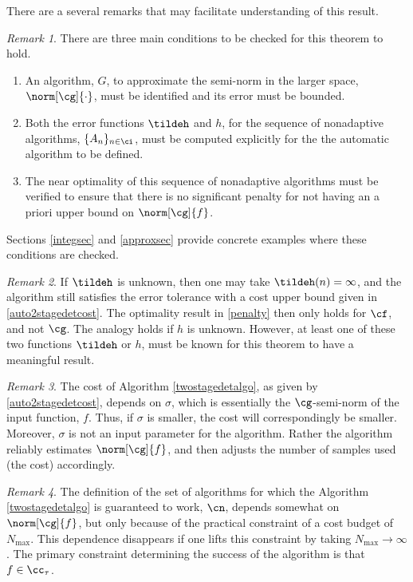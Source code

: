 \documentclass[]{elsarticle}
\theoremstyle{definition}
\theoremstyle{remark}
\newtheorem{rem}{Remark}
\begin{document}
There are a several remarks that may facilitate understanding of this result.

\begin{rem} There are three main conditions to be checked for this theorem to hold.
\begin{enumerate}
\renewcommand{\labelenumi}{\roman{enumi}.}
\item An algorithm, $G$, to approximate the semi-norm in the larger space,  $\norm[\cg]{\cdot}$,  must be identified and its error must be bounded.
\item Both the error functions $\tildeh$ and $h$, for the sequence of nonadaptive algorithms, $\{A_n\}_{n \in \ci}$, must be computed explicitly for the the automatic algorithm to be defined.  
\item The near optimality of this sequence of nonadaptive algorithms must be verified to ensure that there is no significant penalty for not having an a priori upper bound on $\norm[\cg]{f}$.
\end{enumerate}
Sections \ref{integsec} and \ref{approxsec} provide concrete examples where these conditions are checked.
\end{rem}

\begin{rem} If $\tildeh$ is unknown, then one may take $\tildeh(n)=\infty$, and the algorithm still satisfies the error tolerance with a cost upper bound given in \eqref{auto2stagedetcost}.  The optimality result in \eqref{penalty} then only holds for $\cf$, and not $\cg$.  The analogy holds if $h$ is unknown.  However, at least one of these two functions $\tildeh$ or $h$, must be known for this theorem to have a meaningful result.
\end{rem}

\begin{rem} The cost of Algorithm \ref{twostagedetalgo}, as given by \eqref{auto2stagedetcost}, depends on $\sigma$, which is essentially the $\cg$-semi-norm of the input function, $f$.  Thus, if $\sigma$ is smaller, the cost will correspondingly be smaller.  Moreover, $\sigma$ is not an input parameter for the algorithm.  Rather the algorithm reliably estimates $\norm[\cg]{f}$, and then adjusts the number of samples used (the cost) accordingly.
\end{rem}

\begin{rem}
The definition of the set of algorithms for which the Algorithm \ref{twostagedetalgo} is guaranteed to work, $\cn$, depends somewhat on $\norm[\cg]{f}$, but only because of the practical constraint of a cost budget of $N_{\max}$.  This dependence disappears if one lifts this constraint by taking $N_{\max} \to \infty$.  The primary constraint determining the success of the algorithm is that $f \in \cc_{\tau}$.
\end{rem}
\end{document}
